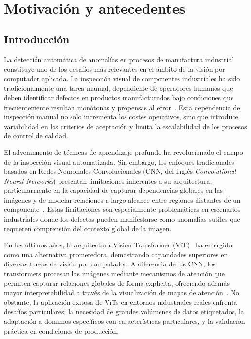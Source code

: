 \chapter{Motivación y antecedentes}
\label{ch:antecedentes}

\section{Introducción}

La detección automática de anomalías en procesos de manufactura industrial constituye uno de los desafíos más relevantes en el ámbito de la visión por computador aplicada. La inspección visual de componentes industriales ha sido tradicionalmente una tarea manual, dependiente de operadores humanos que deben identificar defectos en productos manufacturados bajo condiciones que frecuentemente resultan monótonas y propensas al error~\cite{alber2024evaluating}. Esta dependencia de inspección manual no solo incrementa los costes operativos, sino que introduce variabilidad en los criterios de aceptación y limita la escalabilidad de los procesos de control de calidad.

El advenimiento de técnicas de aprendizaje profundo ha revolucionado el campo de la inspección visual automatizada. Sin embargo, los enfoques tradicionales basados en Redes Neuronales Convolucionales (\acrshort{CNN}, del inglés \textit{Convolutional Neural Networks}) presentan limitaciones inherentes a su arquitectura, particularmente en la capacidad de capturar dependencias globales en las imágenes y de modelar relaciones a largo alcance entre regiones distantes de un componente~\cite{wang2022defect}. Estas limitaciones son especialmente problemáticas en escenarios industriales donde los defectos pueden manifestarse como anomalías sutiles que requieren comprensión del contexto global de la imagen.

En los últimos años, la arquitectura Vision Transformer (\acrshort{ViT})~\cite{dosovitskiy2021vit} ha emergido como una alternativa prometedora, demostrando capacidades superiores en diversas tareas de visión por computador. A diferencia de las \acrshort{CNN}, los transformers procesan las imágenes mediante mecanismos de atención que permiten capturar relaciones globales de forma explícita, ofreciendo además mayor interpretabilidad a través de la visualización de mapas de atención~\cite{sudarshan2025object}. No obstante, la aplicación exitosa de ViTs en entornos industriales reales enfrenta desafíos particulares: la necesidad de grandes volúmenes de datos etiquetados, la adaptación a dominios específicos con características particulares, y la validación práctica en condiciones de producción.

